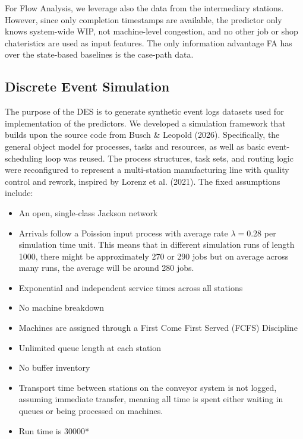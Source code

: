 \documentclass[
]{ceurart}
\begin{document}
For Flow Analysis, we leverage also the data from the intermediary stations. However, since only completion timestamps are available, the predictor only knows system-wide WIP, not machine-level congestion, and no other job 
or shop chateristics are used as input features. The only information advantage FA has over the state-based baselines is the case-path data. 

\subsection{Discrete Event Simulation}

The purpose of the DES is to generate synthetic event logs datasets used for implementation of the predictors. We developed a simulation framework that builds upon the source code from Busch \& Leopold (2026).
Specifically, the general object model for processes, tasks and resources, as well as basic event-scheduling loop was reused. The process structures, task sets, and routing logic were reconfigured to represent a multi-station
manufacturing line with quality control and rework, inspired by Lorenz et al. (2021). The fixed assumptions include:

\begin{itemize}
    \item An open, single-class Jackson network
    \item Arrivals follow a Poission input process with average rate $\lambda = 0.28$ per simulation time unit. This means that in different simulation runs of length 1000, there might be approximately 270 or 290 jobs but on average across many runs, the average will be around 280 jobs.
    \item Exponential and independent service times across all stations
    \item No machine breakdown
    \item Machines are assigned through a First Come First Served (FCFS) Discipline
    \item Unlimited queue length at each station
    \item No buffer inventory
    \item Transport time between stations on the conveyor system is not logged, assuming immediate transfer, meaning all time is spent either waiting in queues or being processed on machines.
    \item Run time is 30000*
\end{itemize}
\end{document}
